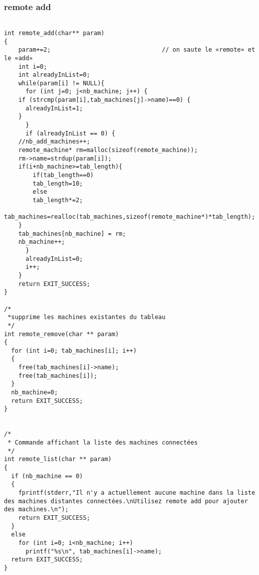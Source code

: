 \documentclass[12pt]{article}
\begin{document}
\subsubsection*{remote add}
\label{remote add}
\begin{verbatim}
 
int remote_add(char** param)
{
    param+=2;                               // on saute le «remote» et le «add»
    int i=0;
    int alreadyInList=0;
    while(param[i] != NULL){
      for (int j=0; j<nb_machine; j++) {
	if (strcmp(param[i],tab_machines[j]->name)==0) {
	  alreadyInList=1;
	}
      } 
      if (alreadyInList == 0) {
	//nb_add_machines++;
	remote_machine* rm=malloc(sizeof(remote_machine));
	rm->name=strdup(param[i]);
	if(i+nb_machine>=tab_length){
	    if(tab_length==0)
		tab_length=10;
	    else
		tab_length*=2;
	    tab_machines=realloc(tab_machines,sizeof(remote_machine*)*tab_length);
	}
	tab_machines[nb_machine] = rm;
	nb_machine++;
      }
      alreadyInList=0;
      i++;
    }
    return EXIT_SUCCESS;
}

/*
 *supprime les machines existantes du tableau
 */
int remote_remove(char ** param) 
{
  for (int i=0; tab_machines[i]; i++) 
  {
    free(tab_machines[i]->name);
    free(tab_machines[i]);
  }
  nb_machine=0;
  return EXIT_SUCCESS;
}


/* 
 * Commande affichant la liste des machines connectées 
 */
int remote_list(char ** param)
{
  if (nb_machine == 0)
  {
    fprintf(stderr,"Il n'y a actuellement aucune machine dans la liste des machines distantes connectées.\nUtilisez remote add pour ajouter des machines.\n");
    return EXIT_SUCCESS;
  }
  else 
    for (int i=0; i<nb_machine; i++)
      printf("%s\n", tab_machines[i]->name);
  return EXIT_SUCCESS;
}


 \end{verbatim}
\end{document}
